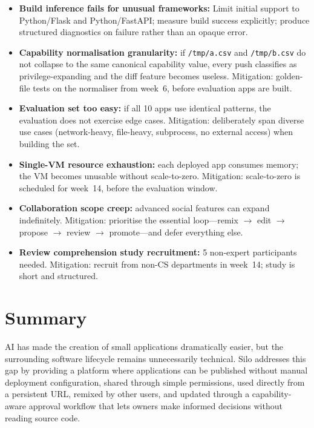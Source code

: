 \documentclass[11pt,a4paper]{article}
\begin{document}
\begin{itemize}[leftmargin=0.7cm]
  \item \textbf{Build inference fails for unusual frameworks:} Limit initial support
    to Python/Flask and Python/FastAPI; measure build success explicitly; produce
    structured diagnostics on failure rather than an opaque error.
  \item \textbf{Capability normalisation granularity:} if \texttt{/tmp/a.csv} and
    \texttt{/tmp/b.csv} do not collapse to the same canonical capability value, every
    push classifies as privilege-expanding and the diff feature becomes useless.
    Mitigation: golden-file tests on the normaliser from week~6, before evaluation
    apps are built.
  \item \textbf{Evaluation set too easy:} if all 10 apps use identical patterns, the
    evaluation does not exercise edge cases. Mitigation: deliberately span diverse use
    cases (network-heavy, file-heavy, subprocess, no external access) when building
    the set.
  \item \textbf{Single-VM resource exhaustion:} each deployed app consumes memory;
    the VM becomes unusable without scale-to-zero. Mitigation: scale-to-zero is
    scheduled for week~14, before the evaluation window.
  \item \textbf{Collaboration scope creep:} advanced social features can expand
    indefinitely. Mitigation: prioritise the essential loop---remix $\to$ edit
    $\to$ propose $\to$ review $\to$ promote---and defer everything else.
  \item \textbf{Review comprehension study recruitment:} 5 non-expert participants
    needed. Mitigation: recruit from non-CS departments in week~14; study is short
    and structured.
\end{itemize}

\section{Summary}

AI has made the creation of small applications dramatically easier, but the surrounding
software lifecycle remains unnecessarily technical. Silo addresses this gap by providing
a platform where applications can be published without manual deployment configuration,
shared through simple permissions, used directly from a persistent URL, remixed by other
users, and updated through a capability-aware approval workflow that lets owners make
informed decisions without reading source code.
\end{document}
